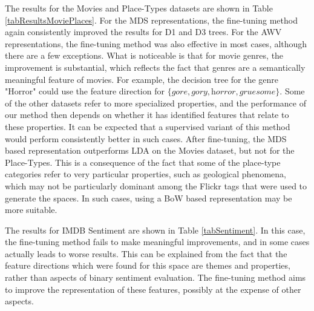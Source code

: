 The results for the Movies and Place-Types datasets are shown in Table \ref{tabResultsMoviePlaces}. For the MDS representations, the fine-tuning method again consistently improved the results for D1 and D3 trees. For the AWV representations, the fine-tuning method was also effective in most cases, although there are a few exceptions. What is noticeable is that for movie genres, the improvement is substantial, which reflects the fact that genres are a semantically meaningful feature of movies. For example, the decision tree for the genre "Horror" could use the feature direction for $\{\textit{gore}, \textit{gory}, \textit{horror}, \textit{gruesome}\}$. Some of the other datasets refer to more specialized properties, and the performance of our method then depends on whether it has identified features that relate to these properties. It can be expected that a supervised variant of this method would perform consistently better in such cases. After fine-tuning, the MDS based representation outperforms LDA on the Movies dataset, but not for the Place-Types. This is a consequence of the fact that some of the place-type categories refer to very particular properties, such as geological phenomena, which may not be particularly dominant among the Flickr tags that were used to generate the spaces. In such cases, using a BoW based representation may be more suitable.

The results for IMDB Sentiment are shown in Table \ref{tabSentiment}. In this case, the fine-tuning method fails to make meaningful improvements, and in some cases actually leads to worse results. This can be explained from the fact that the feature directions which were found for this space are themes and properties, rather than aspects of binary sentiment evaluation. The fine-tuning method aims to improve the representation of these features, possibly at the expense of other aspects.



